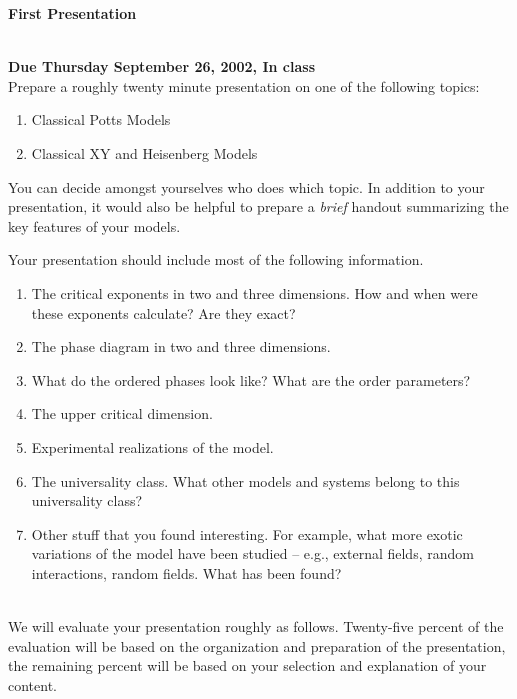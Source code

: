 
\oddsidemargin=0in
\textwidth=6.5in

\renewcommand{\arraystretch}{1.3}



\pagestyle{empty}

\begin{center}
{\large {\bf First Presentation }}\\
\end{center}
\bigskip
\hspace{1cm}\\


{\bf Due Thursday September 26, 2002, In class} \\


Prepare a roughly twenty minute presentation on one of the following
topics: 
\begin{enumerate}
  \item Classical Potts Models
  \item Classical XY and Heisenberg Models
\end{enumerate}
You can decide amongst yourselves who does which topic.  In addition to
your presentation, it would also be helpful to prepare a {\em brief}\/
handout summarizing the key features of your models.

Your presentation should include most of the following information.


\begin{enumerate}

\item The critical exponents in two and three dimensions.  How and
when were these exponents calculate?  Are they exact?

\item The phase diagram in two and three dimensions.

\item What do the ordered phases look like?  What are the order
parameters? 

\item The upper critical dimension.

\item Experimental realizations of the model.

\item The universality class.  What other models and systems belong to
this universality class?

\item Other stuff that you found interesting.  For example, what more
exotic variations of the model have been studied -- e.g., external
fields, random interactions, random fields.  What has been found?


\end{enumerate}

\hspace{2mm}\\
We will evaluate your presentation roughly as follows.  Twenty-five
percent of the evaluation will be based on the organization and
preparation of the presentation, the remaining percent will be based
on your selection and explanation of your content.





